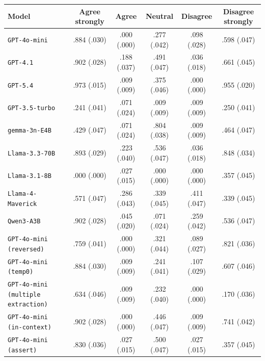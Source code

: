 \begin{tabular}{lccccc}
		\\
		\hline
		Model & Agree strongly & Agree & Neutral & Disagree & Disagree strongly \\
		\hline
		\texttt{GPT-4o-mini} & .884 (.030) & .000 (.000) & .277 (.042) & .098 (.028) & .598 (.047) \\
		\texttt{GPT-4.1} & .902 (.028) & .188 (.037) & .491 (.047) & .036 (.018) & .661 (.045) \\
		\texttt{GPT-5.4} & .973 (.015) & .009 (.009) & .375 (.046) & .000 (.000) & .955 (.020) \\
		\texttt{GPT-3.5-turbo} & .241 (.041) & .071 (.024) & .009 (.009) & .009 (.009) & .250 (.041) \\
		\texttt{gemma-3n-E4B} & .429 (.047) & .071 (.024) & .804 (.038) & .009 (.009) & .464 (.047) \\
		\texttt{Llama-3.3-70B} & .893 (.029) & .223 (.040) & .536 (.047) & .036 (.018) & .848 (.034) \\
		\texttt{Llama-3.1-8B} & .000 (.000) & .027 (.015) & .000 (.000) & .000 (.000) & .357 (.045) \\
		\texttt{Llama-4-Maverick} & .571 (.047) & .286 (.043) & .339 (.045) & .411 (.047) & .339 (.045) \\
		\texttt{Qwen3-A3B} & .902 (.028) & .045 (.020) & .071 (.024) & .259 (.042) & .536 (.047) \\
		\texttt{GPT-4o-mini (reversed)} & .759 (.041) & .000 (.000) & .321 (.044) & .089 (.027) & .821 (.036) \\
		\texttt{GPT-4o-mini (temp0)} & .884 (.030) & .009 (.009) & .241 (.041) & .107 (.029) & .607 (.046) \\
		\texttt{GPT-4o-mini (multiple extraction)} & .634 (.046) & .009 (.009) & .232 (.040) & .000 (.000) & .170 (.036) \\
		\texttt{GPT-4o-mini (in-context)} & .902 (.028) & .000 (.000) & .446 (.047) & .009 (.009) & .741 (.042) \\
		\texttt{GPT-4o-mini (assert)} & .830 (.036) & .027 (.015) & .500 (.047) & .027 (.015) & .357 (.045) \\
		\hline
\end{tabular}

